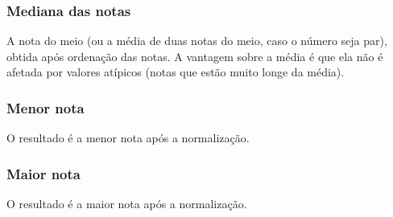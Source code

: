 \subsubsection{Mediana das notas}
A nota do meio (ou a média de duas notas do meio, caso o número seja par), obtida após ordenação das notas. A vantagem sobre a média é que ela não é afetada por valores atípicos (notas que estão muito longe da média).

\begin{figure}[htbp]
 \begin{center}
  \label{fig:cap6_8}
 \end{center}
\end{figure}

\subsubsection{Menor nota}
O resultado é a menor nota após a normalização.

\begin{figure}[htbp]
 \begin{center}
  \label{fig:cap6_9}
 \end{center}
\end{figure}

\subsubsection{Maior nota}
O resultado é a maior nota após a normalização.

\begin{figure}[htbp]
 \begin{center}
  \label{fig:cap6_10}
 \end{center}
\end{figure}


